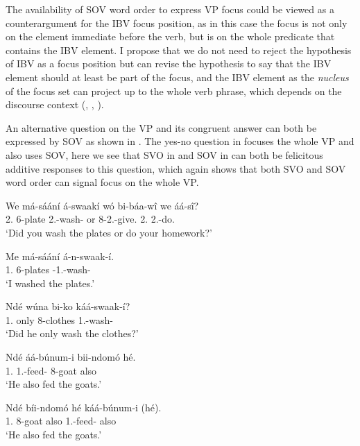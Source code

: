\documentclass[output=paper,colorlinks,citecolor=brown,
]{langscibook}
\begin{document}
The availability of SOV word order to express VP focus could be viewed as a counterargument for the IBV focus position, as in this case the focus is not only on the element immediate before the verb, but is on the whole predicate that contains the IBV element. I propose that we do not need to reject the hypothesis of IBV as a focus position but can revise the hypothesis to say that the IBV element should at least be part of the focus, and the IBV element as the \textit{nucleus} of the focus set can project up to the whole verb phrase, which depends on the discourse context (\citealt[555]{Selkirk1995}, \citealt{Reinhart2006}, \citealt[241]{vanderWal2009a}).

An alternative question on the VP and its congruent answer can both be expressed by SOV as shown in . The yes-no question in  focuses the whole VP and also uses SOV, here we see that SVO in  and SOV in  can both be felicitous additive responses to this question, which again shows that both SVO and SOV word order can signal focus on the whole VP.
 \begin{exe}
    \ex \label{47}
    \begin{xlist}
\ex
\label{47a}
\gll
We má-s\'{a}\'{a}n\'{i} \'{a}-swaak\'{i} wó bi-báa-wî we áá-sî?\\
2\Sg{}.\Pro{} 6-plate 2\Sg{}.\Pst{}-wash-\Pst{} or 8\Rel{}-2\Sm{}.\Pst{}-give.\Pst{} 2\Sg{}.\Pro{} 2\Sg{}.\Pst{}-do.\Pst{}\\
\trans ‘Did you wash the plates or do your homework?’

\ex
\label{47b}
\gll
Me má-sáání á-n-swaak-í.\\
1\Sg{}.\Pro{} 6-plates \Pst{}-1\Sg{}.\Sm{}-wash-\Pst{}\\
\trans ‘I washed the plates.’

    \end{xlist}
\end{exe}
 \begin{exe}
    \ex \label{48}
    \begin{xlist}
\ex
\label{48a}
\gll
Ndé wúna bi-ko káá-swaak-í?\\
1.\Pro{} only 8-clothes 1\Sm{}.\Pst{}-wash-\Pst{}\\
\trans ‘Did he only wash the clothes?’    

\ex
\label{48b}
\gll
Ndé áá-búnum-i bii-ndomó hé.\\
1.\Pro{} 1\Sm{}.\Pst{}-feed-\Pst{} 8-goat also\\
\trans ‘He also fed the goats.’

\ex
\label{48c}
\gll
Ndé bíi-ndomó hé káá-búnum-i (hé).\\
1.\Pro{} 8-goat also 1\Sm{}.\Pst{}-feed-\Pst{} {\db}also\\
\trans ‘He also fed the goats.’

    \end{xlist}
\end{exe}
\end{document}
